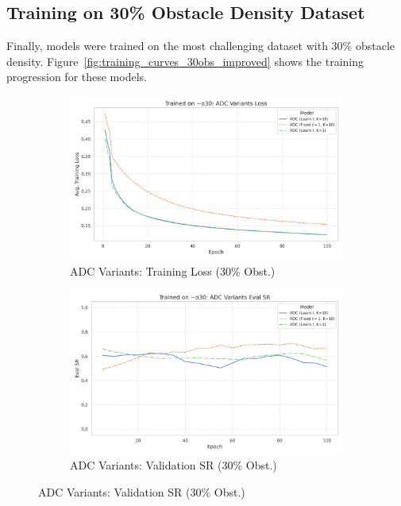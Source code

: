 \subsection{Training on 30\% Obstacle Density Dataset}
\label{subsec:training_30obs}
Finally, models were trained on the most challenging dataset with 30\% obstacle density. Figure~\ref{fig:training_curves_30obs_improved} shows the training progression for these models.

\begin{figure}[htbp]
    \centering
    \begin{subfigure}[b]{0.48\textwidth}
        \centering
        \includegraphics[width=\textwidth]{trainplotbase/TRAINED_ON_30_OBS/training_curves_focused/condition_o30/adc_variants_train_loss.png} %
        \caption{ADC Variants: Training Loss (30\% Obst.)}
        \label{fig:adc_train_loss_30obs}
    \end{subfigure}
    \hfill
    \begin{subfigure}[b]{0.48\textwidth}
        \centering
        \includegraphics[width=\textwidth]{trainplotbase/TRAINED_ON_30_OBS/training_curves_focused/condition_o30/adc_variants_eval_sr.png} %
        \caption{ADC Variants: Validation SR (30\% Obst.)}
        \label{fig:adc_val_sr_30obs}
    \end{subfigure}


\end{figure}
